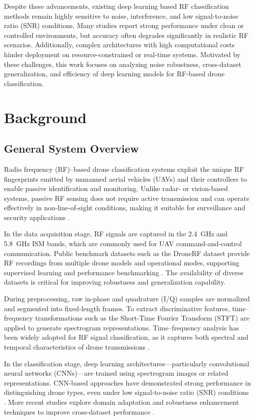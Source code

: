 \documentclass[runningheads]{llncs}
\begin{document}
Despite these advancements, existing deep learning based RF classification methods remain highly sensitive to noise, interference, and low signal-to-noise ratio (SNR) conditions. Many studies report strong performance under clean or controlled environments, but accuracy often degrades significantly in realistic RF scenarios. Additionally, complex architectures with high computational costs hinder deployment on resource-constrained or real-time systems. Motivated by these challenges, this work focuses on analyzing noise robustness, cross-dataset generalization, and efficiency of deep learning models for RF-based drone classification.
\section{Background}
\subsection{General System Overview}

Radio frequency (RF)–based drone classification systems exploit the unique RF
fingerprints emitted by unmanned aerial vehicles (UAVs) and their controllers
to enable passive identification and monitoring. Unlike radar- or vision-based
systems, passive RF sensing does not require active transmission and can operate
effectively in non-line-of-sight conditions, making it suitable for surveillance
and security applications \cite{kim2018drone}.

In the data acquisition stage, RF signals are captured in the 2.4~GHz and
5.8~GHz ISM bands, which are commonly used for UAV command-and-control
communication. Public benchmark datasets such as the DroneRF dataset provide
RF recordings from multiple drone models and operational modes, supporting
supervised learning and performance benchmarking \cite{allahham2019dronerf}.
The availability of diverse datasets is critical for improving robustness and
generalization capability.

During preprocessing, raw in-phase and quadrature (I/Q) samples are normalized
and segmented into fixed-length frames. To extract discriminative features,
time--frequency transformations such as the Short-Time Fourier Transform (STFT)
are applied to generate spectrogram representations. Time--frequency analysis
has been widely adopted for RF signal classification, as it captures both
spectral and temporal characteristics of drone transmissions \cite{oshea2017introduction}.

In the classification stage, deep learning architectures—particularly
convolutional neural networks (CNNs)—are trained using spectrogram images or
related representations. CNN-based approaches have demonstrated strong
performance in distinguishing drone types, even under low signal-to-noise ratio
(SNR) conditions \cite{ozturk2020deep}. More recent studies explore domain
adaptation and robustness enhancement techniques to improve cross-dataset
performance \cite{shi2022domain}.
\end{document}
